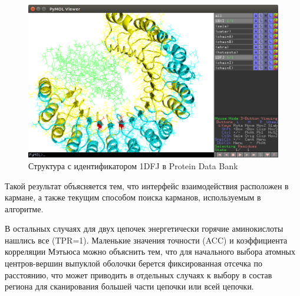 \begin{figure}[h]
\includegraphics[width=\linewidth]{1DFJ.png}

\caption{\small{Структура с идентификатором  1DFJ в Protein Data Bank
 }}
\label{fig:1DFJ}
\end{figure}



Такой результат объясняется тем, что интерфейс взаимодействия расположен в кармане, а также текущим способом поиска карманов, используемым в алгоритме.

В остальных случаях для двух цепочек энергетически горячие аминокислоты нашлись все (TPR=1). Маленькие значения точности (ACC) и коэффициента корреляции Мэтьюса можно объяснить тем, что для начального выбора атомных центров-вершин выпуклой оболочки берется фиксированная отсечка по расстоянию, что может приводить в отдельных случаях к выбору в состав региона для сканирования большей части цепочки или всей цепочки.


